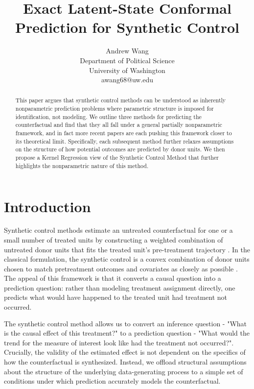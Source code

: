 \documentclass{article}
\title{Exact Latent-State Conformal Prediction for Synthetic Control}
\author{
  Andrew Wang \\
  Department of Political Science\\
  University of Washington\\
  awang68@uw.edu
}
\begin{document}
\maketitle


\begin{abstract}
  This paper argues that synthetic control methods can be understood as inherently nonparametric prediction problems where parametric structure is imposed for identification, not modeling. We outline three methods for predicting the counterfactual and find that they all fall under a general partially nonparametric framework, and in fact more recent papers are each pushing this framework closer to its theoretical limit. Specifically, each subsequent method further relaxes assumptions on the structure of how potential outcomes are predicted by donor units. We then propose a Kernel Regression view of the Synthetic Control Method that further highlights the nonparametric nature of this method.
\end{abstract}


\section{Introduction}

Synthetic control methods estimate an untreated counterfactual for one or a small number of treated units by constructing a weighted combination of untreated donor units that fits the treated unit's pre-treatment trajectory \citep{Abadie2003,Abadie2010}. In the classical formulation, the synthetic control is a convex combination of donor units chosen to match pretreatment outcomes and covariates as closely as possible \citep{Abadie2010}. The appeal of this framework is that it converts a causal question into a prediction question: rather than modeling treatment assignment directly, one predicts what would have happened to the treated unit had treatment not occurred.

The synthetic control method allows us to convert an inference question - "What is the causal effect of this treatment?" to a prediction question - "What would the trend for the measure of interest look like had the treatment not occurred?". Crucially, the validity of the estimated effect is not dependent on the specifics of how the counterfactual is synthesized. Instead, we offload structural assumptions about the structure of the underlying data-generating process to a simple set of conditions under which prediction accurately models the counterfactual.
\end{document}
